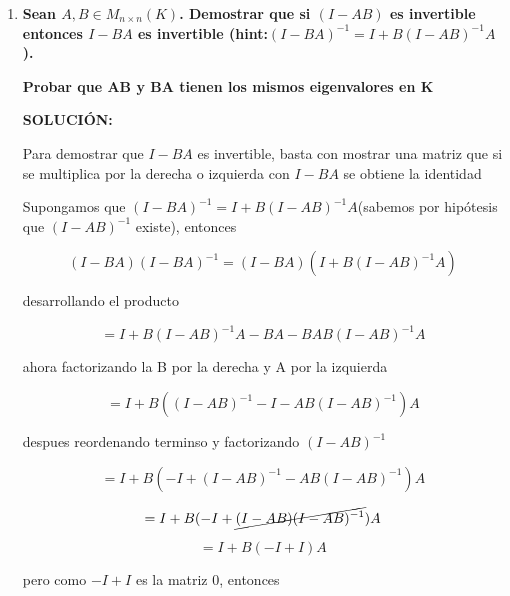 \documentclass[12pt,a4paper]{article}
\begin{document}
\begin{enumerate}






    \item \textbf{Sean $A,B \in M_{n \times n} (K)$. Demostrar que si $(I-AB)$ es invertible entonces $I-BA$ es invertible (hint:$(I-BA)^{-1} = I + B(I-AB)^{-1} A$).}
    
    \textbf{Probar que AB y BA tienen los mismos eigenvalores en K}
    
    \textbf{SOLUCIÓN:}
    
    Para demostrar que $I-BA$ es invertible, basta con mostrar una matriz que si se multiplica por la derecha o izquierda con $I-BA$ se obtiene la identidad
    
    Supongamos que $(I-BA)^{-1} = I + B(I-AB)^{-1} A$(sabemos por hipótesis que $(I-AB)^{-1}$ existe), entonces
    
    \begin{equation*}
        (I-BA)(I-BA)^{-1} = (I-BA)(I + B(I-AB)^{-1} A)
    \end{equation*}
    
    desarrollando el producto
    
    \begin{equation*}
        = I + B(I-AB)^{-1} A -BA -BAB(I-AB)^{-1} A
    \end{equation*}
    
    ahora factorizando la B por la derecha y A por la izquierda
    
    \begin{equation*}
        = I + B((I-AB)^{-1} -I -AB(I-AB)^{-1} )A
    \end{equation*}
    
    despues reordenando terminso y factorizando $(I-AB)^{-1}$
    
    \begin{equation*}
        = I + B(-I + (I-AB)^{-1} -AB(I-AB)^{-1} )A
    \end{equation*}
    
    \begin{equation*}
        = I + B(-I + \cancel{(I-AB)(I-AB)^{-1}} )A
    \end{equation*}
    
    \begin{equation*}
        = I +B(-I+I)A
    \end{equation*}
    
    pero como $-I+I$ es la matriz 0, entonces
    

\end{enumerate}
\end{document}
